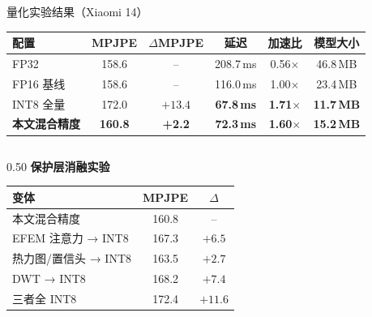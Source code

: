 \documentclass{beamer}
\begin{document}
\begin{frame}[shrink=5]{量化实验结果（Xiaomi 14）}
    \begin{table}
        \centering
        \footnotesize
        \setlength{\tabcolsep}{4pt}
        \renewcommand{\arraystretch}{1.15}
        \begin{tabular}{lccccc}
            \toprule
            配置 & MPJPE & $\Delta$MPJPE & 延迟 & 加速比 & 模型大小 \\
            \midrule
            FP32 & 158.6 & -- & 208.7\,ms & 0.56$\times$ & 46.8\,MB \\
            FP16 基线 & 158.6 & -- & 116.0\,ms & 1.00$\times$ & 23.4\,MB \\
            INT8 全量 & 172.0 & $+13.4$ & \textbf{67.8\,ms} & \textbf{1.71$\times$} & \textbf{11.7\,MB} \\
            \textbf{本文混合精度} & \textbf{160.8} & \textbf{+2.2} & \textbf{72.3\,ms} & \textbf{1.60$\times$} & \textbf{15.2\,MB} \\
            \bottomrule
        \end{tabular}
    \end{table}
    \vspace{3pt}
    \begin{columns}[T]
        \begin{column}{0.50\textwidth}
            \footnotesize\textbf{保护层消融实验}
            \vspace{2pt}
            \begin{table}
                \centering
                \scriptsize
                \setlength{\tabcolsep}{3pt}
                \renewcommand{\arraystretch}{1.1}
                \begin{tabular}{lcc}
                    \toprule
                    变体 & MPJPE & $\Delta$ \\
                    \midrule
                    本文混合精度 & 160.8 & -- \\
                    EFEM 注意力 → INT8 & 167.3 & $+6.5$ \\
                    热力图/置信头 → INT8 & 163.5 & $+2.7$ \\
                    DWT → INT8 & 168.2 & $+7.4$ \\
                    三者全 INT8 & 172.4 & $+11.6$ \\
                    \bottomrule
                \end{tabular}
            \end{table}

\end{column}
\end{columns}
\end{frame}
\end{document}
